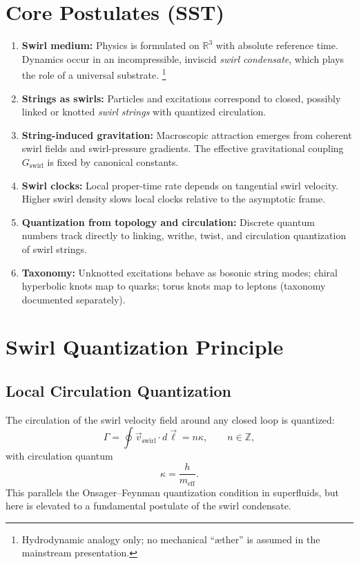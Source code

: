 \documentclass[11pt, a4paper]{article}
\begin{document}
    \section{Core Postulates (SST)}
    \begin{enumerate}
        \item \textbf{Swirl medium:} Physics is formulated on $\mathbb{R}^3$ with absolute reference time. Dynamics occur in an incompressible, inviscid \emph{swirl condensate}, which plays the role of a universal substrate.%
        \footnote{Hydrodynamic analogy only; no mechanical “æther” is assumed in the mainstream presentation.}
        \item \textbf{Strings as swirls:} Particles and excitations correspond to closed, possibly linked or knotted \emph{swirl strings} with quantized circulation.
        \item \textbf{String-induced gravitation:} Macroscopic attraction emerges from coherent swirl fields and swirl-pressure gradients. The effective gravitational coupling $G_{\text{swirl}}$ is fixed by canonical constants.
        \item \textbf{Swirl clocks:} Local proper-time rate depends on tangential swirl velocity. Higher swirl density slows local clocks relative to the asymptotic frame.
        \item \textbf{Quantization from topology and circulation:} Discrete quantum numbers track directly to linking, writhe, twist, and circulation quantization of swirl strings.
        \item \textbf{Taxonomy:} Unknotted excitations behave as bosonic string modes; chiral hyperbolic knots map to quarks; torus knots map to leptons (taxonomy documented separately).
    \end{enumerate}

    \section{Swirl Quantization Principle}

    \subsection{Local Circulation Quantization}
    The circulation of the swirl velocity field around any closed loop is quantized:
    \begin{equation}
        \Gamma = \oint \vec{v}_{\text{swirl}} \cdot d\vec{\ell}
        = n \kappa,
        \qquad n \in \mathbb{Z},
    \end{equation}
    with circulation quantum
    \begin{equation}
        \kappa = \frac{h}{m_\text{eff}}.
    \end{equation}
    This parallels the Onsager--Feynman quantization condition in superfluids, but here is elevated to a fundamental postulate of the swirl condensate.
\end{document}
